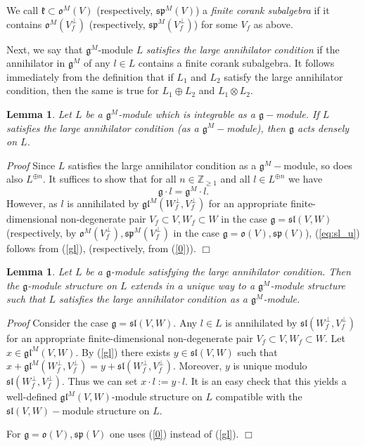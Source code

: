 \documentclass{svmult}
\newtheorem{lem}[theo]{Lemma}
\renewenvironment{proof}{ \emph{Proof}}{$\Box$}
\newcommand {\ZZ} {\mathbb {Z}}
\renewcommand{\sp}{\mathfrak{sp}}
\renewcommand{\sl}{\mathfrak{sl}}
\newcommand{\kk}{\mathfrak{k}}
\newcommand{\oo}{\mathfrak{o}}
\renewcommand{\gg}{\mathfrak{g}}
\newcommand{\gl}{\mathfrak{gl}}
\begin{document}
We call $\kk\subset \oo^M(V)$ (respectively, $\sp^M(V)$) a \textit{finite corank subalgebra}  if  
it contains $ \oo^M(V_f^\perp)$ (respectively, $\sp^M(V_f^\perp)$) for some $V_f$ as above.

Next, we say that $\gg^M$-module $L$ {\it satisfies the large annihilator condition} if the annihilator in $\gg^M$ of any $l\in L$
contains a finite corank subalgebra. It follows immediately from the 	definition that if $L_1$ and $L_2$ satisfy the large annihilator condition,
then the same is true for $L_1\oplus L_2$ and $L_1\otimes L_2$.

\begin{lem}\label{corank2} 
Let $L$ be a $\gg^M$-module which is integrable as a $\gg-$module. 
If $L$ satisfies the large annihilator condition (as a $\gg^M-$module), then $\gg$ acts densely on $L$. 
\end{lem}
\begin{proof} Since $L$ satisfies the large annihilator condition as a $\gg^M-$module, so does also $L^{\oplus n}$. It suffices to show that for all $n \in \ZZ_{\geq 1}$ and all $l\in L^{\oplus n}$ 
we have 
\begin{equation}\label{eq:sl_u}
 \gg\cdot l=\gg^M\cdot l.
\end{equation}
However, as $l$ is annihilated by $\gl^M(W_f^\perp,V_f^\perp)$ for an appropriate finite-dimensional non-degenerate pair $V_f \subset V, W_f \subset W$ in the case $\gg = \sl(V,W)$ (respectively, by $\oo^M(V_f^{\perp}),\sp^M(V_f^{\perp})$ in the case $\gg = \oo(V),\sp(V)$), (\ref{eq:sl_u}) follows from (\ref{gl}), (respectively, from (\ref{0})).
\end{proof}

\begin{lem}\label{corank1} Let $L$ be a $\gg$-module satisfying the large annihilator condition. Then the $\gg$-module
structure on $L$ extends in a unique way to a $\gg^M$-module structure such that $L$ satisfies  the large annihilator condition as a $\gg^M$-module.
\end{lem}

\begin{proof} Consider the case $\gg=\sl(V,W)$. Any $l\in L$ is annihilated by $\sl(W_f^\perp,V_f^\perp)$ for an appropriate finite-dimensional non-degenerate pair $V_f \subset V, W_f \subset W$.
Let $x\in \gl^M(V,W)$.
By (\ref{gl}) there exists $y\in \sl(V,W)$ such that $x+\gl^M(W_f^\perp,V_f^\perp)=y+\sl(W_f^\perp,V_f^\perp)$. Moreover, $y$ is unique modulo $\sl(W_f^\perp,V_f^\perp)$. Thus we can set $x \cdot l:=y \cdot l$. It is an easy check that this yields a well-defined $\gl^M(V,W)$-module structure on $L$ compatible with the $\sl(V,W)-$module structure on $L$. 

For $\gg = \oo(V),\sp(V)$ one uses (\ref{0}) instead of (\ref{gl}).
\end{proof}
\end{document}
